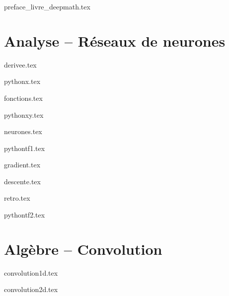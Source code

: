 \documentclass[10pt,twoside,openright]{report}
\begin{document}
\renewcommand{\contentsname}{Sommaire}

{preface_livre_deepmath.tex}
\debutchapitres
{}


\clearemptydoublepage



\part{Analyse -- Réseaux de neurones}

{derivee.tex}

{pythonx.tex}

{fonctions.tex}

{pythonxy.tex}

{neurones.tex}

{pythontf1.tex}

{gradient.tex}

{descente.tex}

{retro.tex}

{pythontf2.tex}


\clearemptydoublepage


\part{Algèbre -- Convolution}

{convolution1d.tex}

{convolution2d.tex}
\end{document}
